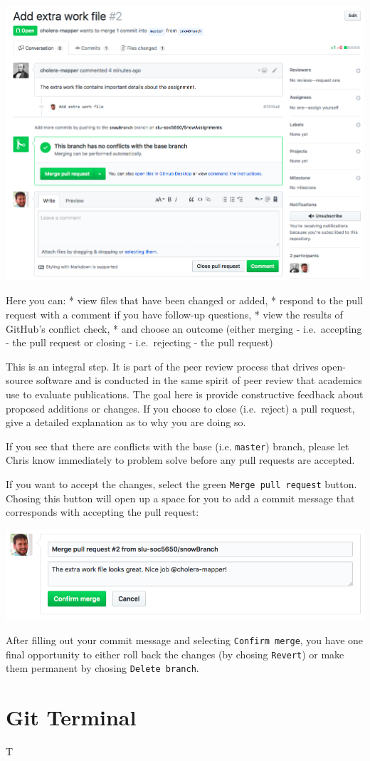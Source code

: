 \documentclass[]{book}
\theoremstyle{definition}
\theoremstyle{definition}
\theoremstyle{definition}
\theoremstyle{remark}
\begin{document}
\includegraphics[width=1\linewidth]{images/branch7}

Here you can: * view files that have been changed or added, * respond to
the pull request with a comment if you have follow-up questions, * view
the results of GitHub's conflict check, * and choose an outcome (either
merging - i.e.~accepting - the pull request or closing - i.e.~rejecting
- the pull request)

This is an integral step. It is part of the peer review process that
drives open-source software and is conducted in the same spirit of peer
review that academics use to evaluate publications. The goal here is
provide constructive feedback about proposed additions or changes. If
you choose to close (i.e.~reject) a pull request, give a detailed
explanation as to why you are doing so.

If you see that there are conflicts with the base (i.e. \texttt{master})
branch, please let Chris know immediately to problem solve before any
pull requests are accepted.

If you want to accept the changes, select the green
\texttt{Merge\ pull\ request} button. Chosing this button will open up a
space for you to add a commit message that corresponds with accepting
the pull request:

\includegraphics[width=1\linewidth]{images/branch8}

After filling out your commit message and selecting
\texttt{Confirm\ merge}, you have one final opportunity to either roll
back the changes (by chosing \texttt{Revert}) or make them permanent by
chosing \texttt{Delete\ branch}.

\section{Git Terminal}\label{git-terminal}

T


\end{document}
